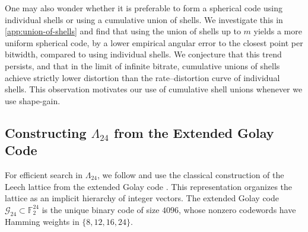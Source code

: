 \documentclass{article}
\theoremstyle{plain}
\theoremstyle{definition}
\theoremstyle{remark}
\begin{document}
One may also wonder whether it is preferable to form a spherical code using individual shells or using a cumulative union of shells. We investigate this in \autoref{app:union-of-shells} and find that using the union of shells up to $m$ yields a more uniform spherical code, by a lower empirical angular error to the closest point per bitwidth, compared to using individual shells. We conjecture that this trend persists, and that in the limit of infinite bitrate, cumulative unions of shells achieve strictly lower distortion than the rate–distortion curve of individual shells. This observation motivates our use of cumulative shell unions whenever we use shape-gain.
\begin{table}[h!]
\vspace{-0.8em}
\centering
\caption{Shell structure of the Leech lattice $\Lambda_{24}$.}
\vspace{-0.2em}
\label{tab:shell-sizes}
\vspace{-1.5em}
\end{table}

\subsection{Constructing $\Lambda_{24}$ from the Extended Golay Code}

For efficient search in $\Lambda_{24}$, we follow \citep{adoul1988nearest} and
use the classical construction of the Leech lattice from the extended Golay
code \citep{conway2013sphere}. This representation organizes the lattice as an
implicit hierarchy of integer vectors. The extended Golay code
$\mathcal{G}_{24} \subset \mathbb{F}_2^{24}$ is the unique binary code of size $4096$, whose nonzero codewords have Hamming weights
in $\{8,12,16,24\}$. 
\end{document}
